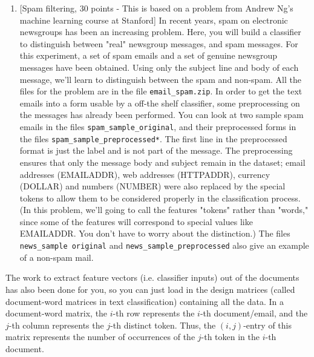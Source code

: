 \documentclass[11pt]{article}
\providecommand{\tightlist}{%
      \setlength{\itemsep}{0pt}\setlength{\parskip}{0pt}}
\begin{document}
    \begin{enumerate}
\def\labelenumi{\arabic{enumi})}
\setcounter{enumi}{1}
\tightlist
\item
  {[}Spam filtering, 30 points - This is based on a problem from Andrew
  Ng's machine learning course at Stanford{]} In recent years, spam on
  electronic newsgroups has been an increasing problem. Here, you will
  build a classifier to distinguish between "real" newsgroup messages,
  and spam messages. For this experiment, a set of spam emails and a set
  of genuine newsgroup messages have been obtained. Using only the
  subject line and body of each message, we'll learn to distinguish
  between the spam and non-spam. All the files for the problem are in
  the file \texttt{email\_spam.zip}. In order to get the text emails
  into a form usable by a off-the shelf classifier, some preprocessing
  on the messages has already been performed. You can look at two sample
  spam emails in the files \texttt{spam\_sample\_original}, and their
  preprocessed forms in the files \texttt{spam\_sample\_preprocessed*}.
  The first line in the preprocessed format is just the label and is not
  part of the message. The preprocessing ensures that only the message
  body and subject remain in the dataset; email addresses (EMAILADDR),
  web addresses (HTTPADDR), currency (DOLLAR) and numbers (NUMBER) were
  also replaced by the special tokens to allow them to be considered
  properly in the classification process. (In this problem, we'll going
  to call the features "tokens" rather than "words," since some of the
  features will correspond to special values like EMAILADDR. You don't
  have to worry about the distinction.) The files
  \texttt{news\_sample\ original} and
  \texttt{news\_sample\_preprocessed} also give an example of a non-spam
  mail.
\end{enumerate}

The work to extract feature vectors (i.e. classifier inputs) out of the
documents has also been done for you, so you can just load in the design
matrices (called document-word matrices in text classification)
containing all the data. In a document-word matrix, the \(i\)-th row
represents the \(i\)-th document/email, and the \(j\)-th column
represents the \(j\)-th distinct token. Thus, the \((i,j)\)-entry of
this matrix represents the number of occurrences of the \(j\)-th token
in the \(i\)-th document.
\end{document}
